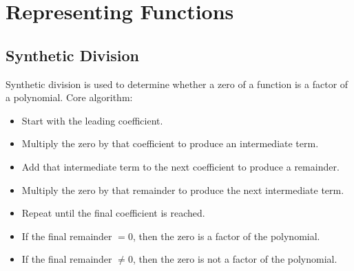\section{Representing Functions}

\subsection{Synthetic Division}
    Synthetic division is used to determine whether a zero of a function
    is a factor of a polynomial.
    Core algorithm:
    \begin{itemize}
        \item Start with the leading coefficient.
        \item Multiply the zero by that coefficient to produce an intermediate term. 
        \item Add that intermediate term to the next coefficient to produce a remainder.
        \item Multiply the zero by that remainder to produce the next intermediate term.
        \item Repeat until the final coefficient is reached.
        \item If the final remainder $= 0$, then the zero is a factor of the polynomial.
        \item If the final remainder $\neq 0$, then the zero is not a factor of the polynomial.
    \end{itemize}
    \newpage
    \inputminted[linenos, breaklines]{python}{001/synthetic_division.py}
